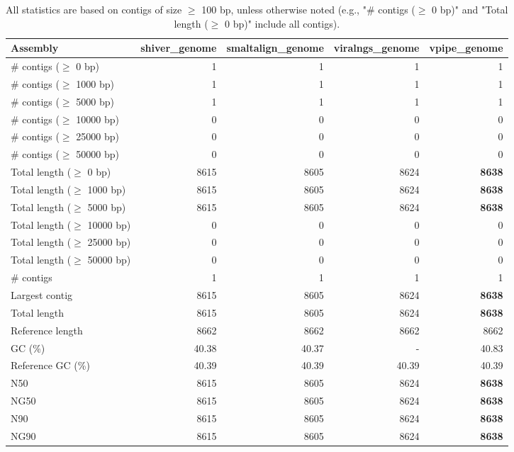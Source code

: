 \documentclass[12pt,a4paper]{article}
\begin{document}
\begin{table}[ht]
\begin{center}
\caption{All statistics are based on contigs of size $\geq$ 100 bp, unless otherwise noted (e.g., "\# contigs ($\geq$ 0 bp)" and "Total length ($\geq$ 0 bp)" include all contigs).}
\begin{tabular}{|l*{4}{|r}|}
\hline
Assembly & shiver\_genome & smaltalign\_genome & viralngs\_genome & vpipe\_genome \\ \hline
\# contigs ($\geq$ 0 bp) & 1 & 1 & 1 & 1 \\ \hline
\# contigs ($\geq$ 1000 bp) & 1 & 1 & 1 & 1 \\ \hline
\# contigs ($\geq$ 5000 bp) & 1 & 1 & 1 & 1 \\ \hline
\# contigs ($\geq$ 10000 bp) & 0 & 0 & 0 & 0 \\ \hline
\# contigs ($\geq$ 25000 bp) & 0 & 0 & 0 & 0 \\ \hline
\# contigs ($\geq$ 50000 bp) & 0 & 0 & 0 & 0 \\ \hline
Total length ($\geq$ 0 bp) & 8615 & 8605 & 8624 & {\bf 8638} \\ \hline
Total length ($\geq$ 1000 bp) & 8615 & 8605 & 8624 & {\bf 8638} \\ \hline
Total length ($\geq$ 5000 bp) & 8615 & 8605 & 8624 & {\bf 8638} \\ \hline
Total length ($\geq$ 10000 bp) & 0 & 0 & 0 & 0 \\ \hline
Total length ($\geq$ 25000 bp) & 0 & 0 & 0 & 0 \\ \hline
Total length ($\geq$ 50000 bp) & 0 & 0 & 0 & 0 \\ \hline
\# contigs & 1 & 1 & 1 & 1 \\ \hline
Largest contig & 8615 & 8605 & 8624 & {\bf 8638} \\ \hline
Total length & 8615 & 8605 & 8624 & {\bf 8638} \\ \hline
Reference length & 8662 & 8662 & 8662 & 8662 \\ \hline
GC (\%) & 40.38 & 40.37 & - & 40.83 \\ \hline
Reference GC (\%) & 40.39 & 40.39 & 40.39 & 40.39 \\ \hline
N50 & 8615 & 8605 & 8624 & {\bf 8638} \\ \hline
NG50 & 8615 & 8605 & 8624 & {\bf 8638} \\ \hline
N90 & 8615 & 8605 & 8624 & {\bf 8638} \\ \hline
NG90 & 8615 & 8605 & 8624 & {\bf 8638} \\ \hline

\end{tabular}
\end{center}
\end{table}
\end{document}
